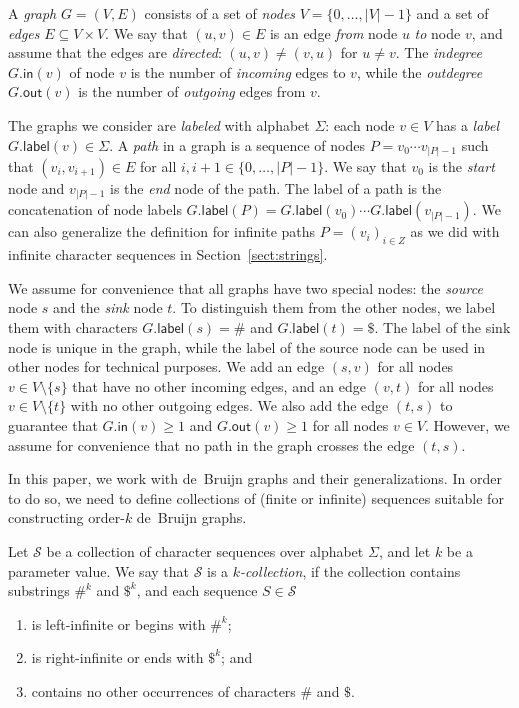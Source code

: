 \documentclass[a4paper,UKenglish]{lipics-v2016}
\newcommand{\set}[1]{\ensuremath{\{ #1 \}}}
\newcommand{\abs}[1]{\ensuremath{\lvert #1 \rvert}}
\newcommand{\gindegree}{\ensuremath{\mathsf{in}}}
\newcommand{\goutdegree}{\ensuremath{\mathsf{out}}}
\newcommand{\glabel}{\ensuremath{\mathsf{label}}}
\newcommand{\kcollection}[1]{$#1$\nobreakdash-collection}
\newcommand{\orderk}[1]{order\nobreakdash-$#1$}
\begin{document}
A \emph{graph} $G = (V, E)$ consists of a set of \emph{nodes} $V = \set{0, \dotsc, \abs{V}-1}$ and a set of \emph{edges} $E \subseteq V \times V$. We say that $(u, v) \in E$ is an edge \emph{from} node $u$ \emph{to} node $v$, and assume that the edges are \emph{directed}: $(u, v) \ne (v, u)$ for $u \ne v$. The \emph{indegree} $G.\gindegree(v)$ of node $v$ is the number of \emph{incoming} edges to $v$, while the \emph{outdegree} $G.\goutdegree(v)$ is the number of \emph{outgoing} edges from $v$.

The graphs we consider are \emph{labeled} with alphabet $\Sigma$: each node $v \in V$ has a \emph{label} $G.\glabel(v) \in \Sigma$. A \emph{path} in a graph is a sequence of nodes $P = v_{0} \dotsm v_{\abs{P}-1}$ such that $(v_{i}, v_{i+1}) \in E$ for all $i, i+1 \in \set{0, \dotsc, \abs{P}-1}$. We say that $v_{0}$ is the \emph{start} node and $v_{\abs{P}-1}$ is the \emph{end} node of the path. The label of a path is the concatenation of node labels $G.\glabel(P) = G.\glabel(v_{0}) \dotsm G.\glabel(v_{\abs{P}-1})$. We can also generalize the definition for infinite paths $P = (v_{i})_{i \in Z}$ as we did with infinite character sequences in Section~\ref{sect:strings}.

We assume for convenience that all graphs have two special nodes: the \emph{source} node $s$ and the \emph{sink} node $t$. To distinguish them from the other nodes, we label them with characters $G.\glabel(s) = \#$ and $G.\glabel(t) = \$$. The label of the sink node is unique in the graph, while the label of the source node can be used in other nodes for technical purposes. We add an edge $(s, v)$ for all nodes $v \in V \setminus \set{s}$ that have no other incoming edges, and an edge $(v, t)$ for all nodes $v \in V \setminus \set{t}$ with no other outgoing edges. We also add the edge $(t, s)$ to guarantee that $G.\gindegree(v) \ge 1$ and $G.\goutdegree(v) \ge 1$ for all nodes $v \in V$. However, we assume for convenience that no path in the graph crosses the edge $(t, s)$.

In this paper, we work with de~Bruijn graphs and their generalizations. In order to do so, we need to define collections of (finite or infinite) sequences suitable for constructing \orderk{k} de~Bruijn graphs.

\begin{definition}[\kcollection{k}]
Let $\mathcal{S}$ be a collection of character sequences over alphabet $\Sigma$, and let $k$ be a parameter value. We say that $\mathcal{S}$ is a \emph{\kcollection{k}}, if the collection contains substrings $\#^{k}$ and $\$^{k}$, and each sequence $S \in \mathcal{S}$
\begin{enumerate}
\item is left-infinite or begins with $\#^{k}$;
\item is right-infinite or ends with $\$^{k}$; and
\item contains no other occurrences of characters $\#$ and $\$$.
\end{enumerate}
\end{definition}
\end{document}
